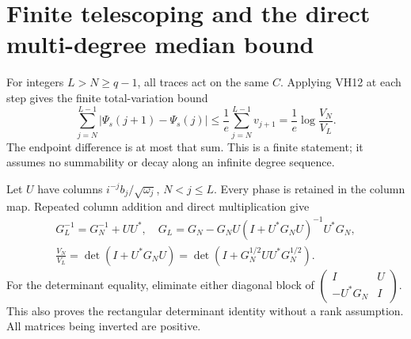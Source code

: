 \documentclass[11pt]{article}
\begin{document}
\section{Finite telescoping and the direct multi-degree median bound}

For integers \(L>N\ge q-1\), all traces act on the same \(C\).
Applying VH12 at each step gives the finite total-variation bound
\begin{equation}\tag{VH13}\label{hvh:VH13}
\sum_{j=N}^{L-1}|\Psi_s(j+1)-\Psi_s(j)|
\le\frac1e\sum_{j=N}^{L-1}v_{j+1}
=\frac1e\log\frac{V_N}{V_L}.
\end{equation}
The endpoint difference is at most that sum. This is a finite statement;
it assumes no summability or decay along an infinite degree sequence.

Let \(U\) have columns \(i^{-j}b_j/\sqrt{\omega_j}\), \(N<j\le L\).
Every phase is retained in the column map. Repeated column addition
and direct multiplication give
\begin{equation}\tag{VH14}\label{hvh:VH14}
\begin{gathered}
G_L^{-1}=G_N^{-1}+UU^*,\quad
G_L=G_N-G_NU(I+U^*G_NU)^{-1}U^*G_N,\\
\frac{V_N}{V_L}=\det(I+U^*G_NU)
=\det(I+G_N^{1/2}UU^*G_N^{1/2}).
\end{gathered}
\end{equation}
For the determinant equality, eliminate either diagonal block of
\(\left(\begin{smallmatrix}I&U\\-U^*G_N&I\end{smallmatrix}\right)\).
This also proves the rectangular determinant identity without a rank
assumption. All matrices being inverted are positive.
\end{document}

